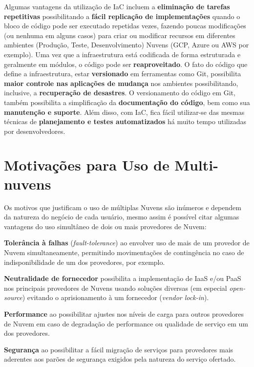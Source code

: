 \documentclass[12pt]{article}
\begin{document}
	Algumas vantagens da utilização de IaC incluem a \textbf{eliminação de tarefas repetitivas} possibilitando a  \textbf{fácil replicação de implementações} quando o bloco de código pode ser executado repetidas vezes, fazendo poucas modificações (ou nenhuma em alguns casos) para criar ou modificar recursos em diferentes ambientes (Produção, Teste, Desenvolvimento) Nuvens (GCP, Azure ou AWS por exemplo). Uma vez que a infraestrutura  está codificada de forma estruturada e geralmente em módulos, o código pode ser \textbf{reaproveitado}. O fato do código que define a infraestrutura, estar \textbf{versionado} em ferramentas como Git, possibilita \textbf{maior controle nas aplicações de mudança} nos ambientes possibilitando, inclusive, a \textbf{recuperação de desastres}. O versionamento do código em Git, também possibilita a simplificação da \textbf{documentação do código}, bem como sua \textbf{manutenção e suporte}. Além disso, com IaC, fica fácil utilizar-se das mesmas técnicas de \textbf{planejamento e testes automatizados} há muito tempo utilizadas por desenvolvedores.	
	
	\section{Motivações para Uso de Multi-nuvens}
	
	Os motivos que justificam o uso de múltiplas Nuvens são inúmeros e dependem da natureza do negócio de cada usuário, mesmo assim é possível citar algumas vantagens do uso simultâneo de dois ou mais provedores de Nuvem:
	
	\textbf{Tolerância à falhas} (\textit{fault-tolerance}) ao envolver uso de mais de um provedor de Nuvem simultaneamente, permitindo movimentações de contingência no caso de indisponibilidade de um dos provedores, por exemplo.
	
	\textbf{Neutralidade de fornecedor} possibilita a implementação de IaaS e/ou PaaS nos principais provedores de Nuvens usando soluções diversas (em especial \textit{open-source}) evitando o aprisionamento à um fornecedor (\textit{vendor lock-in}).
	
	\textbf{Performance} ao possibilitar ajustes nos níveis de carga para outros provedores de Nuvem em caso de degradação de performance ou qualidade de serviço em um dos provedores.
	
	\textbf{Segurança} ao possibilitar a fácil migração de serviços para provedores mais aderentes aos parões de segurança exigidos pela natureza do serviço ofertado.
	
\end{document}
